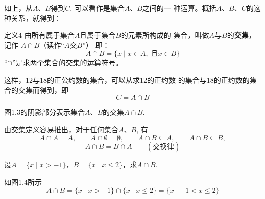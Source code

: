 如上，从$A$、$B$得到$C$, 可以看作是集合$A$、$B$之间的一
种运算。概括$A$、$B$、$C$的这种关系，就得到：

\begin{thm}{定义4}
    由所有属于集合$A$且属于集合$B$的元素所构成的
集合，叫做$A$与$B$的\textbf{交集}，记作
$A\cap B$（读作“$A$交$B$”）
即：
\[A\cap B=\{x\mid x\in A,\;\text{且} x\in B\}\]
“$\cap$”是求两个集合的交集的运算符号。
\end{thm}

这样，12与18的正公约数的集合，可以从求12的正约数
的集合与18的正约数的集合的交集而得到，即
\[C=A\cap B\]

图1.3的阴影部分表示集合$A$、$B$的交集$A\cap B$.

由交集定义容易推出，对于任何集合$A$、$B$, 有
\[A\cap A=A,\qquad A\cap \emptyset =\emptyset,\qquad  A\cap B\subseteq A,\qquad A\cap B\subseteq B, \]
\[A\cap B=B\cap A\qquad (\text{交换律})\]
\begin{figure}[htp]
\begin{minipage}{0.45\textwidth}
    \centering
{}
    \caption{}
  \end{minipage}
  \hfill 
  \begin{minipage}{0.45\textwidth}
    \centering
    \caption{}
  \end{minipage}
\end{figure}

\begin{example}
设$A=\{x\mid x>-1\}$，$B=\{x\mid x\le 2\}$，求$A\cap B$.
\end{example}

\begin{solution}
    如图1.4所示
    \[A\cap B=\{x\mid x>-1\}\cap\{x\mid x\le 2\}=\{x\mid -1<x\le 2\}\]
\end{solution}


